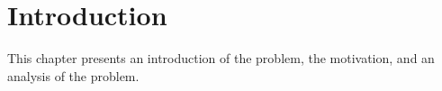 \chapter{Introduction}
This chapter presents an introduction of the problem, the motivation, and an analysis of the problem.



